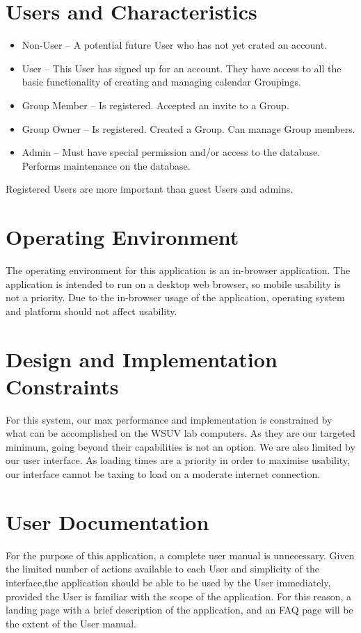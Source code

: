 \documentclass{scrreprt}
\begin{document}
\section{Users and Characteristics}
\begin{itemize}
	\item Non-User – A potential future User who has not yet crated an account.
    \item User – This User has signed up for an account. They have access to
all the basic functionality of creating and managing calendar Groupings.
    \item Group Member – Is registered. Accepted an invite to a Group.
    \item Group Owner – Is registered. Created a Group. Can manage Group members.
    \item Admin – Must have special permission and/or access to the database. Performs
maintenance on the database.
\end{itemize}
Registered Users are more important than guest Users and admins.

\section{Operating Environment}
The operating environment for this application is an in-browser application. The
application is intended to run on a desktop web browser, so mobile usability is
not a priority. Due to the in-browser usage of the application, operating system
and platform should not affect usability.

\section{Design and Implementation Constraints}
For this system, our max performance and implementation is constrained by what
can be accomplished on the WSUV lab computers. As they are our targeted minimum,
going beyond their capabilities is not an option. We are also limited by our user
interface. As loading times are a priority in order to maximise usability, our
interface cannot be taxing to load on a moderate internet connection.

\section{User Documentation}
For the purpose of this application, a complete user manual is unnecessary.
Given the limited number of actions available to each User and simplicity of the
interface,the application should be able to be used by the User immediately,
provided the User is familiar with the scope of the application. For this
reason, a landing page with a brief description of the application, and an FAQ
page will be the extent of the User manual.
\end{document}
